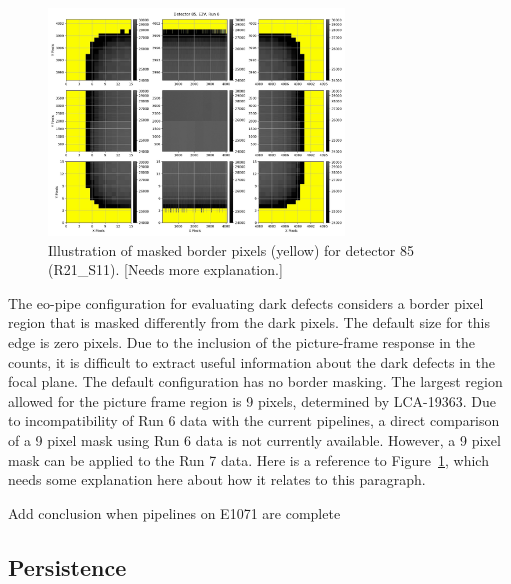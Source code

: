 \begin{figure}[H]
\begin{centering}
\includegraphics[width=0.7\textwidth]{sections/figures/baselineCharacterization/detector_85.jpg}
\caption{Illustration of masked border pixels (yellow) for detector 85 (R21\_S11). [Needs more explanation.]}
\label{fig:fig-edge-mask}
\end{centering}
\end{figure}

The eo-pipe configuration for evaluating dark defects considers a border pixel
region that is masked differently from the dark pixels. The default size for this edge is zero pixels. Due to the inclusion of the picture-frame response in the counts, it is difficult to
extract useful information about the dark defects in the focal plane. The default
configuration has no border masking. The largest region allowed for the
picture frame region is 9 pixels, determined by LCA-19363. Due to incompatibility of Run 6 data with the current pipelines, a direct comparison of a 9 pixel mask using Run 6 data is not currently available. However, a 9
pixel mask can be applied to the Run 7 data.  Here is a reference to Figure~\ref{fig:fig-edge-mask}, which needs some explanation here about how it relates to this paragraph.

Add conclusion when pipelines on E1071 are complete

\subsection{Persistence}\label{persistence}

